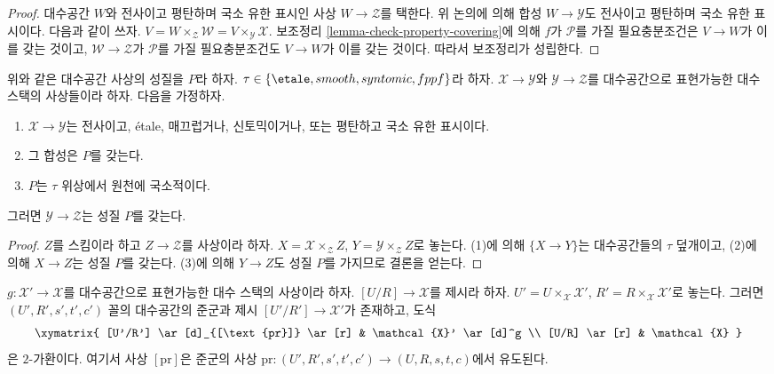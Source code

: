 \begin{proof}
대수공간 $W$와 전사이고 평탄하며 국소 유한 표시인 사상
$W \to \mathcal{Z}$를 택한다. 위 논의에 의해 합성
$W \to \mathcal{Y}$도 전사이고 평탄하며 국소 유한 표시이다. 다음과 같이 쓰자.
$V = W \times_\mathcal{Z} \mathcal{W} = V \times_\mathcal{Y} \mathcal{X}$.
보조정리 \ref{lemma-check-property-covering}에 의해
$f$가 $\mathcal{P}$를 가질 필요충분조건은 $V \to W$가 이를 갖는 것이고,
$\mathcal{W} \to \mathcal{Z}$가 $\mathcal{P}$를 가질 필요충분조건도
$V \to W$가 이를 갖는 것이다. 따라서 보조정리가 성립한다.
\end{proof}

\begin{lemma}
\label{lemma-check-property-after-precomposing}
위와 같은 대수공간 사상의 성질을 $P$라 하자.
$\tau \in \{\etale, smooth, syntomic, fppf\}$라 하자.
$\mathcal{X} \to \mathcal{Y}$와 $\mathcal{Y} \to \mathcal{Z}$를
대수공간으로 표현가능한 대수 스택의 사상들이라 하자. 다음을 가정하자.
\begin{enumerate}
\item $\mathcal{X} \to \mathcal{Y}$는 전사이고, \'etale, 매끄럽거나,
신토믹이거나, 또는 평탄하고 국소 유한 표시이다.
\item 그 합성은 $P$를 갖는다.
\item $P$는 $\tau$ 위상에서 원천에 국소적이다.
\end{enumerate}
그러면 $\mathcal{Y} \to \mathcal{Z}$는 성질 $P$를 갖는다.
\end{lemma}

\begin{proof}
$Z$를 스킴이라 하고 $Z \to \mathcal{Z}$를 사상이라 하자.
$X = \mathcal{X} \times_\mathcal{Z} Z$,
$Y = \mathcal{Y} \times_\mathcal{Z} Z$로 놓는다. (1)에 의해
$\{X \to Y\}$는 대수공간들의 $\tau$ 덮개이고, (2)에 의해
$X \to Z$는 성질 $P$를 갖는다. (3)에 의해 $Y \to Z$도 성질
$P$를 가지므로 결론을 얻는다.
\end{proof}

\begin{lemma}
\label{lemma-representable-in-terms-presentations}
$g : \mathcal{X}' \to \mathcal{X}$를 대수공간으로 표현가능한
대수 스택의 사상이라 하자. $[U/R] \to \mathcal{X}$를 제시라 하자.
$U' = U \times_\mathcal{X} \mathcal{X}'$,
$R' = R \times_\mathcal{X} \mathcal{X}'$로 놓는다.
그러면 $(U', R', s', t', c')$ 꼴의 대수공간의 준군과 제시
$[U'/R'] \to \mathcal{X}'$가 존재하고, 도식
$$
\xymatrix{
[U'/R'] \ar[d]_{[\text{pr}]} \ar[r] & \mathcal{X}' \ar[d]^g \\
[U/R] \ar[r] & \mathcal{X}
}
$$
은 $2$-가환이다. 여기서 사상 $[\text{pr}]$은 준군의 사상
$\text{pr} : (U', R', s', t', c') \to (U, R, s, t, c)$에서 유도된다.
\end{lemma}


